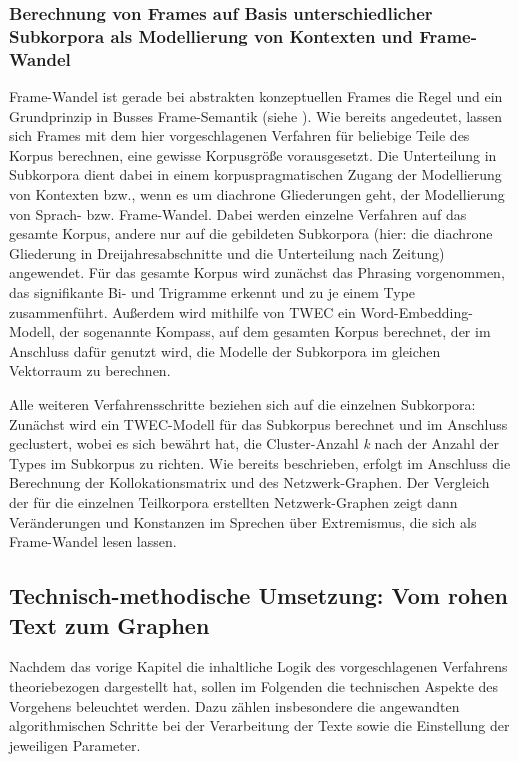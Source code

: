 \subsubsection{Berechnung von Frames auf Basis unterschiedlicher Subkorpora als Modellierung von Kontexten und Frame-Wandel}\label{berechnung-von-frames-auf-basis-unterschiedlicher-subkorpora-als-modellierung-von-kontexten-und-frame-wandel}

Frame-Wandel ist gerade bei abstrakten konzeptuellen Frames die Regel und ein Grundprinzip in Busses Frame-Semantik (siehe ). Wie bereits angedeutet, lassen sich Frames mit dem hier vorgeschlagenen Verfahren für beliebige Teile des Korpus berechnen, eine gewisse Korpusgröße vorausgesetzt. Die Unterteilung in Subkorpora dient dabei in einem korpuspragmatischen Zugang der Modellierung von Kontexten bzw., wenn es um diachrone Gliederungen geht, der Modellierung von Sprach- bzw. Frame-Wandel. Dabei werden einzelne Verfahren auf das gesamte Korpus, andere nur auf die gebildeten Subkorpora (hier: die diachrone Gliederung in Dreijahresabschnitte und die Unterteilung nach Zeitung) angewendet. Für das gesamte Korpus wird zunächst das Phrasing vorgenommen, das signifikante Bi- und Trigramme erkennt und zu je einem Type zusammenführt. Außerdem wird mithilfe von TWEC ein Word-Embedding-Modell, der sogenannte Kompass, auf dem gesamten Korpus berechnet, der im Anschluss dafür genutzt wird, die Modelle der Subkorpora im gleichen Vektorraum zu berechnen.

\largerpage[-1]
Alle weiteren Verfahrensschritte beziehen sich auf die einzelnen Subkorpora: Zunächst wird ein TWEC-Modell für das Subkorpus berechnet und im Anschluss geclustert, wobei es sich bewährt hat, die Cluster-Anzahl \emph{k} nach der Anzahl der Types im Subkorpus zu richten. Wie bereits beschrieben, erfolgt im Anschluss die Berechnung der Kollokationsmatrix und des Netzwerk-Graphen. Der Vergleich der für die einzelnen Teilkorpora erstellten Netzwerk-Graphen zeigt dann Veränderungen und Konstanzen im Sprechen über Extremismus, die sich als Frame-Wandel lesen lassen.

\subsection{Technisch-methodische Umsetzung: Vom rohen Text zum Graphen}\label{technisch-methodische-umsetzung-vom-rohen-text-zum-graphen}

Nachdem das vorige Kapitel die inhaltliche Logik des vorgeschlagenen Verfahrens theoriebezogen dargestellt hat, sollen im Folgenden die technischen Aspekte des Vorgehens beleuchtet werden. Dazu zählen insbesondere die angewandten algorithmischen Schritte bei der Verarbeitung der Texte sowie die Einstellung der jeweiligen Parameter.

